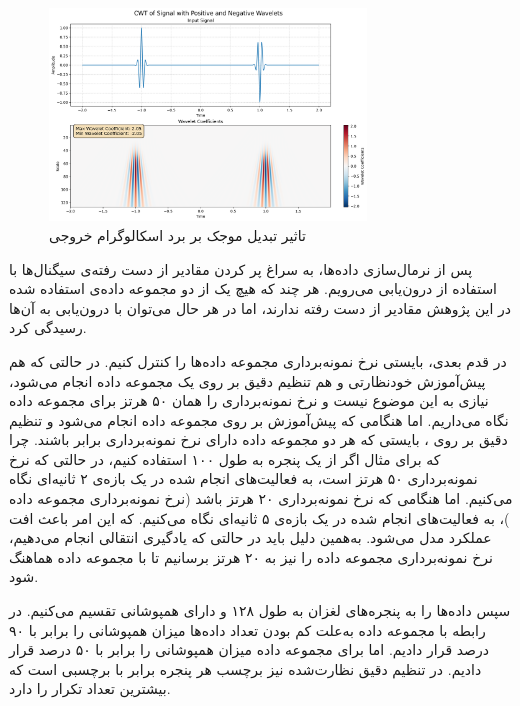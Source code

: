 \begin{figure}[htb!]
\centering
\includegraphics[width=0.75\textwidth]{Images/Chapter4/unnormalized-wavelet.png}
\caption{تاثیر تبدیل موجک بر برد اسکالوگرام خروجی}
\label{fig:unnormalized-wavelet}
\end{figure}

پس از نرمال‌سازی داده‌ها، به سراغ پر کردن مقادیر از دست رفته‌ی سیگنال‌ها با استفاده از درون‌یابی می‌رویم. هر چند که هیچ یک از دو مجموعه داده‌ی استفاده شده در این پژوهش مقادیر از دست رفته ندارند، اما در هر حال می‌توان با درون‌یابی به آن‌ها رسیدگی کرد.

در قدم بعدی، بایستی نرخ نمونه‌برداری مجموعه داده‌ها را کنترل کنیم. در حالتی که هم پیش‌آموزش خودنظارتی و هم تنظیم دقیق بر روی یک مجموعه داده انجام می‌شود، نیازی به این موضوع نیست و نرخ نمونه‌برداری را همان ۵۰ هرتز
برای مجموعه داده 
نگاه می‌داریم. اما هنگامی که پیش‌آموزش بر روی مجموعه داده 
انجام می‌شود و تنظیم دقیق بر روی ،
بایستی که هر دو مجموعه داده دارای نرخ نمونه‌برداری برابر باشند. چرا که برای مثال اگر از یک پنجره به طول ۱۰۰ استفاده کنیم، در حالتی که نرخ نمونه‌برداری ۵۰ هرتز است، به فعالیت‌های انجام شده در یک بازه‌ی ۲ ثانیه‌ای نگاه می‌کنیم. اما هنگامی که نرخ نمونه‌برداری ۲۰ هرتز باشد (نرخ نمونه‌برداری مجموعه داده )،
به فعالیت‌های انجام شده در یک بازه‌ی ۵ ثانیه‌ای نگاه می‌کنیم. که این امر باعث افت عملکرد مدل می‌شود. به‌همین دلیل باید در حالتی که یادگیری انتقالی انجام می‌دهیم، نرخ نمونه‌برداری مجموعه داده  را نیز به ۲۰ هرتز برسانیم تا با مجموعه داده 
هماهنگ شود.

سپس داده‌ها را به پنجره‌های لغزان به طول ۱۲۸ و دارای همپوشانی تقسیم می‌کنیم. در رابطه با مجموعه داده  به‌علت کم بودن تعداد داده‌ها میزان همپوشانی را برابر با ۹۰ درصد قرار دادیم. اما برای مجموعه داده  میزان همپوشانی را برابر با ۵۰ درصد قرار دادیم. در تنظیم دقیق نظارت‌شده نیز برچسب هر پنجره برابر با برچسبی است که بیشترین تعداد تکرار را دارد.

